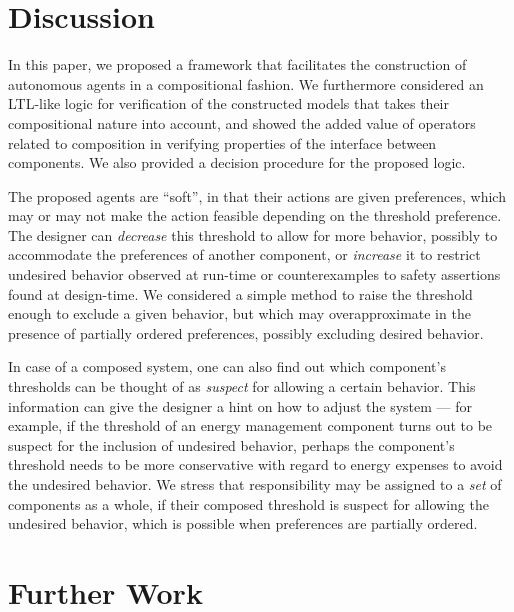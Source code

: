\documentclass[a4paper]{article}
\newcommand{\buchi}{B\"{u}chi}
\theoremstyle{definition}
\begin{document}
\section{Discussion}%
\label{section:conclusion}

In this paper, we proposed a framework that facilitates the construction of autonomous agents in a compositional fashion. We furthermore considered an LTL-like logic for verification of the constructed models that takes their compositional nature into account, and showed the added value of operators related to composition in verifying properties of the interface between components. We also provided a decision procedure for the proposed logic. %

The proposed agents are ``soft'', in that their actions are given preferences, which may or may not make the action feasible depending on the threshold preference. The designer can \emph{decrease} this threshold  to allow for more behavior, possibly to accommodate the preferences of another component, or \emph{increase} it to restrict undesired behavior observed at run-time or counterexamples to safety assertions found at design-time. We considered a simple method to raise the threshold enough to exclude a given behavior, but which may overapproximate in the presence of partially ordered preferences, possibly excluding desired behavior. 

In case of a composed system, one can also find out which component's thresholds can be thought of as \emph{suspect} for allowing a certain behavior. This information can give the designer a hint on how to adjust the system --- for example, if the threshold of an energy management component turns out to be suspect for the inclusion of undesired behavior, perhaps the component's threshold needs to be more conservative with regard to energy expenses to avoid the undesired behavior. We stress that responsibility may be assigned to a \emph{set} of components as a whole, if their composed threshold is suspect for allowing the undesired behavior, which is possible when preferences are partially ordered.

\section{Further Work}%
\label{section:further-work}
\end{document}
